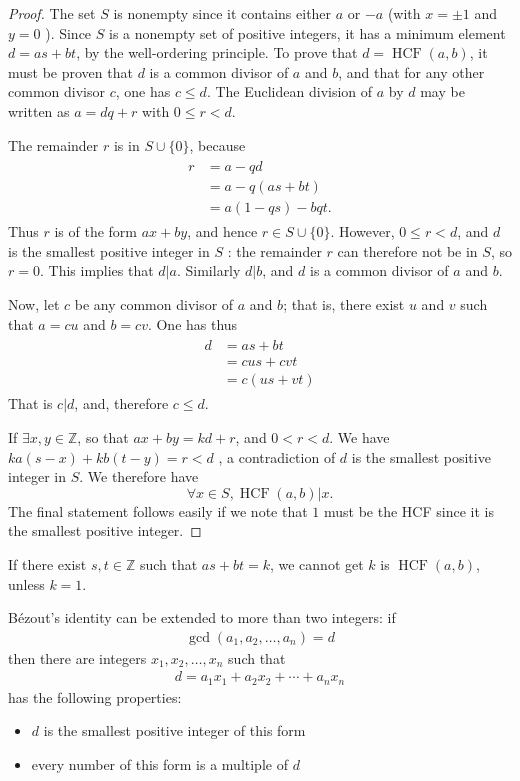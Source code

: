 \documentclass{article}
\newcommand{\HCF}{\operatorname{HCF}}
\begin{document}
\begin{proof}
The set $S$ is nonempty since it contains either $a$ or $-a$ (with $x=\pm 1$ and $y=0$ ). Since $S$ is a nonempty set of positive integers, it has a minimum element $d=a s+b t$, by the  well-ordering principle. To prove that $d=\HCF(a, b)$, it must be proven that $d$ is a common divisor of $a$ and $b$, and that for any other common divisor $c$, one has $c \leq d$.
The Euclidean division of $a$ by $d$ may be written as $a=d q+r$ with $ 0 \leq r<d .$

The remainder $r$ is in $S \cup\{0\}$, because
\begin{align*}
\begin{aligned}
r &=a-q d \\
&=a-q(a s+b t) \\
&=a(1-q s)-b q t .
\end{aligned}
\end{align*}
Thus $r$ is of the form $a x+b y$, and hence $r \in S \cup\{0\}$. However, $0 \leq r<d$, and $d$ is the smallest positive integer in $S$ : the remainder $r$ can therefore not be in $S$, so $r=0$. This implies that $d|a$. Similarly $d|b$, and $d$ is a common divisor of $a$ and $b$.

Now, let $c$ be any common divisor of $a$ and $b$; that is, there exist $u$ and $v$ such that $a=c u$ and $b=c v$. One has thus
\begin{align*}
\begin{aligned}
d &=a s+b t \\
&=c u s+c v t \\
&=c(u s+v t)
\end{aligned}
\end{align*}
That is $c|d$, and, therefore $c \leq d$.

If $\exists x,y\in \mathbb{Z}$, so that $ax+by=kd+r$, and $0<r<d$. We have
$k a(s- x)+kb(t-y)=r<d$
, a contradiction of $d$ is the smallest positive integer in $S$. We therefore have 
$$\forall x\in S, \HCF(a,b)|x.$$
The final statement follows easily if we note that $1$ must be the HCF since it is the smallest positive integer.
\end{proof}
\begin{rema}
If there exist $s, t \in \mathbb{Z}$ such that $a s+b t=k$, we cannot get $k$ is $\HCF(a,b)$, unless $k=1$.
\end{rema}
\begin{cora}\label{cora:doncadf}
Bézout's identity can be extended to more than two integers: if
\begin{align*}
\operatorname{gcd}\left(a_{1}, a_{2}, \ldots, a_{n}\right)=d
\end{align*}
then there are integers $x_{1}, x_{2}, \ldots, x_{n}$ such that
\begin{align*}
d=a_{1} x_{1}+a_{2} x_{2}+\cdots+a_{n} x_{n}
\end{align*}
has the following properties:
\begin{itemize}
    \item $d$ is the smallest positive integer of this form
    \item every number of this form is a multiple of $d$
\end{itemize}
\end{cora}
\end{document}
